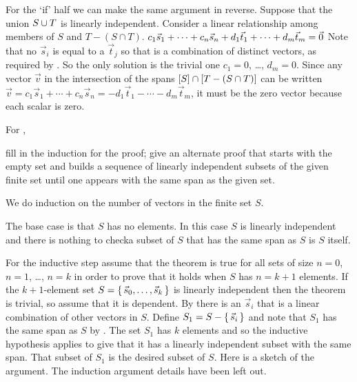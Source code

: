 \begin{exercises}
\begin{answer}
\begin{exparts}
          For the `if' half we can make the same argument in reverse.
          Suppose that the union $S\cup T$ is linearly independent.
          Consider a linear relationship among members of 
          $S$ and $T-(S\cap T)$.        
          $c_1\vec{s}_1+\cdots+c_n\vec{s}_n
            +d_1\vec{t}_1+\cdots+d_m\vec{t}_m
            =\vec{0}$
          Note that no $\vec{s}_i$ is equal to a $\vec{t}_j$
          so that is a combination of distinct vectors, as required by 
          .
          So the only solution 
          is the trivial one $c_1=0$, \ldots, $d_m=0$. 
          Since any vector $\vec{v}$ 
          in the intersection of the spans
          $\relax [S\relax ]\cap \relax [T-(S\cap T)\relax ]$ 
          can be written 
          $\vec{v}=c_1\vec{s}_1+\cdots+c_n\vec{s}_n
            =-d_1\vec{t}_1-\cdots-d_m\vec{t}_m$,
          it must be the zero vector because each scalar is zero.
      \end{exparts}  
    \end{answer}
  \recommended \item \label{exer:FillIndDetProofSetHasLISub}
    For ,
    \begin{exparts}
       \partsitem fill in the induction for the proof;
       \partsitem give an alternate proof that starts with the empty
         set and builds
         a sequence of linearly independent subsets of the given finite set
         until one appears with the same span as the given set.
    \end{exparts}
    \begin{answer}
      \begin{exparts}
         \partsitem We do induction on the number of vectors in the finite set
           \( S \).

           The base case is that $S$ has no elements.
           In this case $S$ is linearly independent and there is nothing to 
           check\Dash a subset of $S$ that has the same span as $S$ is $S$
           itself.

           For the inductive step assume that the theorem is true for all 
           sets of size $n=0$, $n=1$, \ldots, $n=k$ 
           in order to prove that it holds when \( S \) has $n=k+1$ elements.
           If the $k+1$-element set \( S=\mbox{$\{\,\vec{s}_0,\dots,\vec{s}_{k}\,\}$} \) 
           is linearly independent then the theorem is trivial,
           so assume that it is dependent.
           By  there is an \( \vec{s}_i \)
           that is a linear combination of other vectors in \( S \).
           Define \( S_1=S-\mbox{$\{\,\vec{s}_i\,\}$} \) and note that 
           \( S_1 \) has the same span as \( S \) by
           .
           The set \( S_1 \) has \( k \) elements and 
           so the inductive hypothesis
           applies to give that it has a linearly independent subset with the 
           same span.
           That subset of \( S_1 \) is the desired subset of \( S \).
         \partsitem Here is a sketch of the argument.
           The induction argument details have been left out.


\end{exparts}
\end{answer}
\end{exercises}
